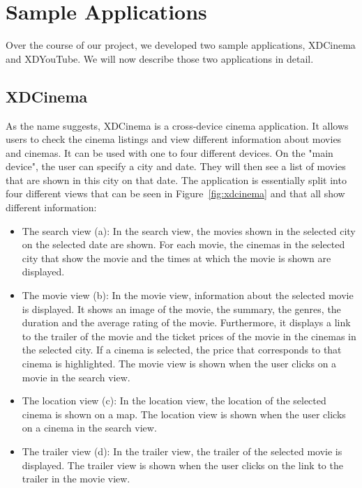 \chapter{Sample Applications}

Over the course of our project, we developed two sample applications, XDCinema and XDYouTube. We will now describe those two applications in detail.

\section{XDCinema}

As the name suggests, XDCinema is a cross-device cinema application. It allows users to check the cinema listings and view different information about movies and cinemas. It can be used with one to four different devices. On the "main device", the user can specify a city and date. They will then see a list of movies that are shown in this city on that date. The application is essentially split into four different views that can be seen in Figure~\ref{fig:xdcinema} and that all show different information:
\begin{itemize}
	\item The search view (a): In the search view, the movies shown in the selected city on the selected date are shown. For each movie, the cinemas in the selected city that show the movie and the times at which the movie is shown are displayed.
	\item The movie view (b): In the movie view, information about the selected movie is displayed. It shows an image of the movie, the summary, the genres, the duration and the average rating of the movie. Furthermore, it displays a link to the trailer of the movie and the ticket prices of the movie in the cinemas in the selected city. If a cinema is selected, the price that corresponds to that cinema is highlighted. The movie view is shown when the user clicks on a movie in the search view.
	\item The location view (c): In the location view, the location of the selected cinema is shown on a map. The location view is shown when the user clicks on a cinema in the search view.
	\item The trailer view (d): In the trailer view, the trailer of the selected movie is displayed. The trailer view is shown when the user clicks on the link to the trailer in the movie view.
\end{itemize}

